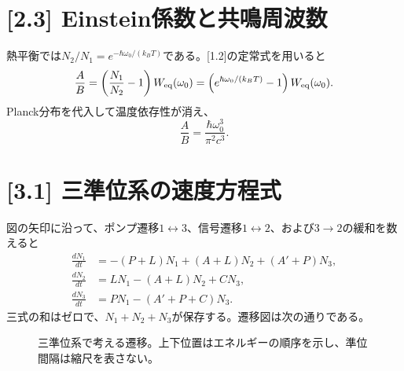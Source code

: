\documentclass[11pt,a4paper]{article}
\begin{document}
\section*{[2.3] Einstein係数と共鳴周波数}
熱平衡では$N_2/N_1=e^{-\hbar\omega_0/(k_BT)}$である。[1.2]の定常式を用いると
\begin{equation}
 \frac{A}{B}=
 \left(\frac{N_1}{N_2}-1\right)W_{\rm eq}(\omega_0)
 =\left(e^{\hbar\omega_0/(k_BT)}-1\right)W_{\rm eq}(\omega_0).
\end{equation}
Planck分布を代入して温度依存性が消え、
\begin{equation}
 \boxed{\frac{A}{B}=\frac{\hbar\omega_0^3}{\pi^2c^3}}.
\end{equation}

\section*{[3.1] 三準位系の速度方程式}
図の矢印に沿って、ポンプ遷移$1\leftrightarrow3$、信号遷移$1\leftrightarrow2$、および$3\to2$の緩和を数えると
\begin{align}
 \frac{dN_1}{dt}&=-(P+L)N_1+(A+L)N_2+(A'+P)N_3,\\
 \frac{dN_2}{dt}&=LN_1-(A+L)N_2+CN_3,\\
 \frac{dN_3}{dt}&=PN_1-(A'+P+C)N_3.
\end{align}
三式の和はゼロで、$N_1+N_2+N_3$が保存する。遷移図は次の通りである。
\begin{figure}[htbp]
\centering
{}
\caption{三準位系で考える遷移。上下位置はエネルギーの順序を示し、準位間隔は縮尺を表さない。}
\end{figure}
\end{document}
